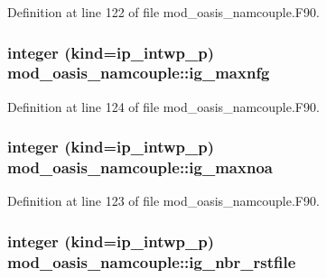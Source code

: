 Definition at line 122 of file mod\+\_\+oasis\+\_\+namcouple.\+F90.

\hypertarget{classmod__oasis__namcouple_aab2d4bcc2dc767df51f99f907f4f3e6e}{
\subsubsection[{ig\+\_\+maxnfg}]{\setlength{\rightskip}{0pt plus 5cm}integer (kind=ip\+\_\+intwp\+\_\+p) mod\+\_\+oasis\+\_\+namcouple\+::ig\+\_\+maxnfg\hspace{0.3cm}{\ttfamily [private]}}}\label{classmod__oasis__namcouple_aab2d4bcc2dc767df51f99f907f4f3e6e}


Definition at line 124 of file mod\+\_\+oasis\+\_\+namcouple.\+F90.

\hypertarget{classmod__oasis__namcouple_ae66cf9f63b6c440406c9b675caef7759}{
\subsubsection[{ig\+\_\+maxnoa}]{\setlength{\rightskip}{0pt plus 5cm}integer (kind=ip\+\_\+intwp\+\_\+p) mod\+\_\+oasis\+\_\+namcouple\+::ig\+\_\+maxnoa\hspace{0.3cm}{\ttfamily [private]}}}\label{classmod__oasis__namcouple_ae66cf9f63b6c440406c9b675caef7759}


Definition at line 123 of file mod\+\_\+oasis\+\_\+namcouple.\+F90.

\hypertarget{classmod__oasis__namcouple_a05148b30ca97c536b40a896153c8921f}{
\subsubsection[{ig\+\_\+nbr\+\_\+rstfile}]{\setlength{\rightskip}{0pt plus 5cm}integer (kind=ip\+\_\+intwp\+\_\+p) mod\+\_\+oasis\+\_\+namcouple\+::ig\+\_\+nbr\+\_\+rstfile\hspace{0.3cm}{\ttfamily [private]}}}\label{classmod__oasis__namcouple_a05148b30ca97c536b40a896153c8921f}


